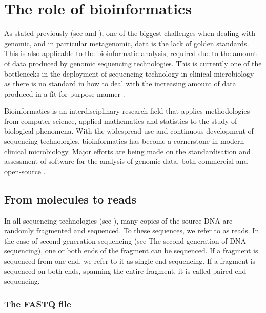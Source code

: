 \section{The role of bioinformatics} \label{sec:_intro_bioinformatics}

As stated previously (see  and ), one of the biggest challenges when dealing with genomic, and in particular metagenomic, data is the lack of golden standards. This is also applicable to the bioinformatic analysis, required due to the amount of data produced by genomic sequencing technologies. This is currently one of the bottlenecks in the deployment of sequencing technology in clinical microbiology as there is no standard in how to deal with the increasing amount of data produced in a fit-for-purpose manner \citep{carrico_primer_2018}.

Bioinformatics is an interdisciplinary research field that applies methodologies from computer science, applied mathematics and statistics to the study of biological phenomena\citep{carrico_primer_2018}. With the widespread use and continuous development of sequencing technologies, bioinformatics has become a cornerstone in modern clinical microbiology. 
Major efforts are being made on the standardisation and assessment of software for the analysis of genomic data, both commercial and open-source \cite{angers-loustau_challenges_2018, gruening_recommendations_2019, sczyrba_critical_2017, couto_critical_2018}. 

\subsection{From molecules to reads}

In all sequencing technologies (see ), many copies of the source \ac{DNA} are randomly fragmented and sequenced. To these sequences, we refer to as reads. In the case of second-generation sequencing (see  The second-generation of \ac{DNA} sequencing), one or both ends of the fragment can be sequenced. If a fragment is sequenced from one end, we refer to it as single-end sequencing. If a fragment is sequenced on both ends, spanning the entire fragment, it is called paired-end sequencing.

\subsubsection{The FASTQ file} \label{sssec:_intro_fastq}

